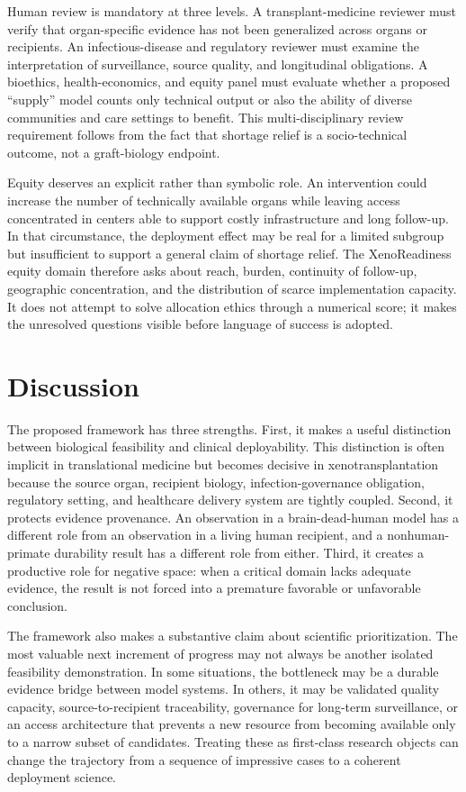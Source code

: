 \documentclass[conference]{IEEEtran}
\newcommand{\xeno}{xenotransplantation}
\begin{document}
Human review is mandatory at three levels. A transplant-medicine reviewer must verify that organ-specific evidence has not been generalized across organs or recipients. An infectious-disease and regulatory reviewer must examine the interpretation of surveillance, source quality, and longitudinal obligations. A bioethics, health-economics, and equity panel must evaluate whether a proposed ``supply'' model counts only technical output or also the ability of diverse communities and care settings to benefit. This multi-disciplinary review requirement follows from the fact that shortage relief is a socio-technical outcome, not a graft-biology endpoint.

Equity deserves an explicit rather than symbolic role. An intervention could increase the number of technically available organs while leaving access concentrated in centers able to support costly infrastructure and long follow-up. In that circumstance, the deployment effect may be real for a limited subgroup but insufficient to support a general claim of shortage relief. The XenoReadiness equity domain therefore asks about reach, burden, continuity of follow-up, geographic concentration, and the distribution of scarce implementation capacity. It does not attempt to solve allocation ethics through a numerical score; it makes the unresolved questions visible before language of success is adopted.

\section{Discussion}

The proposed framework has three strengths. First, it makes a useful distinction between biological feasibility and clinical deployability. This distinction is often implicit in translational medicine but becomes decisive in \xeno{} because the source organ, recipient biology, infection-governance obligation, regulatory setting, and healthcare delivery system are tightly coupled. Second, it protects evidence provenance. An observation in a brain-dead-human model has a different role from an observation in a living human recipient, and a nonhuman-primate durability result has a different role from either. Third, it creates a productive role for negative space: when a critical domain lacks adequate evidence, the result is not forced into a premature favorable or unfavorable conclusion.

The framework also makes a substantive claim about scientific prioritization. The most valuable next increment of progress may not always be another isolated feasibility demonstration. In some situations, the bottleneck may be a durable evidence bridge between model systems. In others, it may be validated quality capacity, source-to-recipient traceability, governance for long-term surveillance, or an access architecture that prevents a new resource from becoming available only to a narrow subset of candidates. Treating these as first-class research objects can change the trajectory from a sequence of impressive cases to a coherent deployment science.
\end{document}

